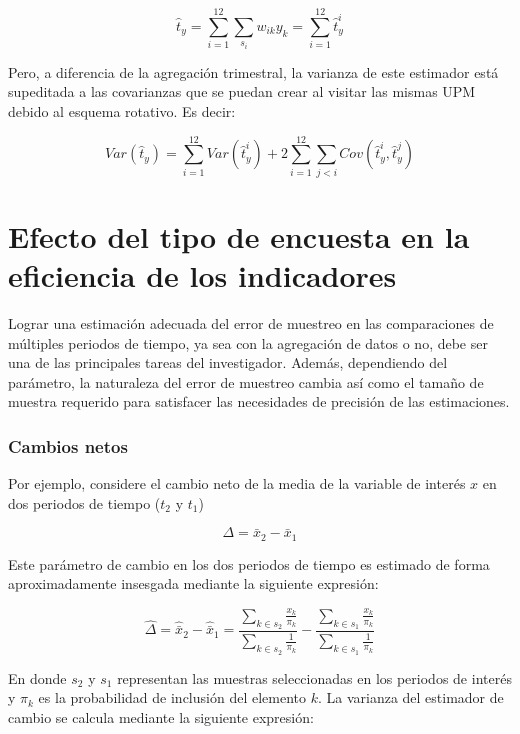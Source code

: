 \documentclass[
  10pt,
  spanish,
]{book}
\begin{document}
\[
\hat{t}_y 
= \sum_{i=1}^{12}\sum_{s_i} w_{ik} y_k 
= \sum_{i=1}^{12} \hat{t}_{y}^i
\]

Pero, a diferencia de la agregación trimestral, la varianza de este
estimador está supeditada a las covarianzas que se puedan crear al
visitar las mismas UPM debido al esquema rotativo. Es decir:

\[
Var(\hat{t}_y) 
= \sum_{i=1}^{12} Var(\hat{t}_{y}^i)
+ 2 \sum_{i=1}^{12} \sum_{j < i} Cov(\hat{t}_{y}^i, \hat{t}_{y}^j)
\]

\hypertarget{efecto-del-tipo-de-encuesta-en-la-eficiencia-de-los-indicadores}{%
\section{Efecto del tipo de encuesta en la eficiencia de los indicadores}\label{efecto-del-tipo-de-encuesta-en-la-eficiencia-de-los-indicadores}}

Lograr una estimación adecuada del error de muestreo en las
comparaciones de múltiples periodos de tiempo, ya sea con la agregación
de datos o no, debe ser una de las principales tareas del investigador.
Además, dependiendo del parámetro, la naturaleza del error de muestreo
cambia así como el tamaño de muestra requerido para satisfacer las
necesidades de precisión de las estimaciones.

\hypertarget{cambios-netos}{%
\subsubsection*{Cambios netos}\label{cambios-netos}}

Por ejemplo, considere el cambio neto de la media de la variable de
interés \(x\) en dos periodos de tiempo (\(t_2\) y \(t_1\))

\[
\Delta = \bar{x}_2 - \bar{x}_1
\]

Este parámetro de cambio en los dos periodos de tiempo es estimado de
forma aproximadamente insesgada mediante la siguiente expresión:

\[
\hat{\Delta} = \hat{\bar{x}}_2 - \hat{\bar{x}}_1
= \frac{\sum_{k\in s_2}\frac{x_{k}}{\pi_k}}{\sum_{k\in s_2}\frac{1}{\pi_k}} - \frac{\sum_{k\in s_1}\frac{x_{k}}{\pi_k}}{\sum_{k\in s_1}\frac{1}{\pi_k}} 
\]

En donde \(s_2\) y \(s_1\) representan las muestras seleccionadas en los
periodos de interés y \(\pi_k\) es la probabilidad de inclusión del
elemento \(k\). La varianza del estimador de cambio se calcula mediante la
siguiente expresión:
\end{document}
